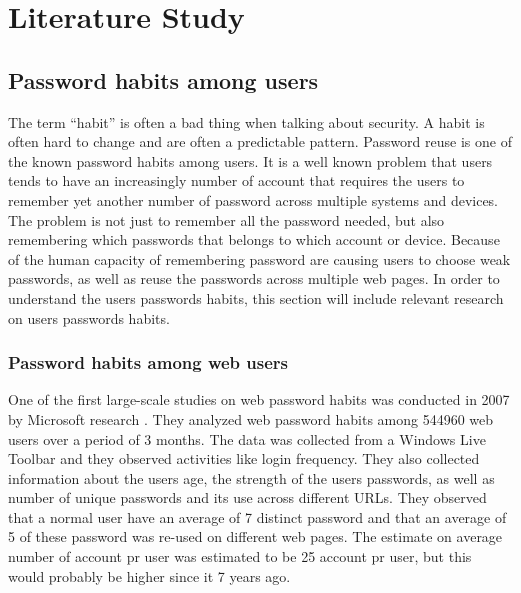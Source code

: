 
\chapter{Literature Study}

  \section{Password habits among users}

    The term ``habit'' is often a bad thing when talking about security. A habit is often hard to change and are often a predictable pattern. Password reuse is one of the known password habits among users. It is a well known problem that users tends to have an increasingly number of account that requires the users to remember yet another number of password across multiple systems and devices. The problem is not just to remember all the password needed, but also remembering which passwords that belongs to which account or device. Because of the human capacity of remembering password are causing users to choose weak passwords, as well as reuse the passwords across multiple web pages. In order to understand the users passwords habits, this section will include relevant research on users passwords habits.

    \subsection{Password habits among web users}


    One of the first large-scale studies on web password habits was conducted in 2007 by Microsoft research \cite{habits1}. They analyzed web password habits among 544960 web users over a period of 3 months. The data was collected from a Windows Live Toolbar and they observed activities like login frequency. They also collected information about the users age, the strength of the users passwords, as well as number of unique passwords and its use across different URLs. They observed that a normal user have an average of 7 distinct password and that an average of 5 of these password was re-used on different web pages. The estimate on average number of account pr user was estimated to be 25 account pr user, but this would probably be higher since it 7 years ago. 

